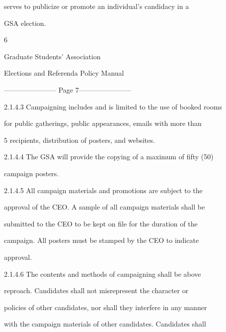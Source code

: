                 serves  to  publicize  or  promote  an  individual’s  candidacy  in  a  

                GSA election.   

           



                                                         6  

                                                                                                                    

                                  Graduate Students’ Association  

                            Elections and Referenda Policy Manual  

  


----------------------- Page 7-----------------------

2.1.4.3        Campaigning includes and is limited to the use of booked rooms  

               for public gatherings, public appearances, emails with more than  

               5 recipients, distribution of posters, and websites.  

2.1.4.4        The  GSA  will  provide  the  copying  of  a  maximum  of  fifty  (50)  

               campaign posters.   

  

2.1.4.5        All   campaign   materials   and   promotions   are   subject   to   the  

               approval of the CEO. A sample of all campaign materials shall be  

               submitted  to  the  CEO  to  be  kept  on  file  for  the  duration  of  the  

               campaign.  All  posters  must  be  stamped  by  the  CEO  to  indicate  

               approval.   

  

2.1.4.6        The   contents   and   methods   of   campaigning   shall   be   above  

               reproach.  Candidates  shall  not  misrepresent  the  character  or  

               policies of other candidates, nor shall they interfere in any manner  

               with the campaign materials of other candidates. Candidates shall  

